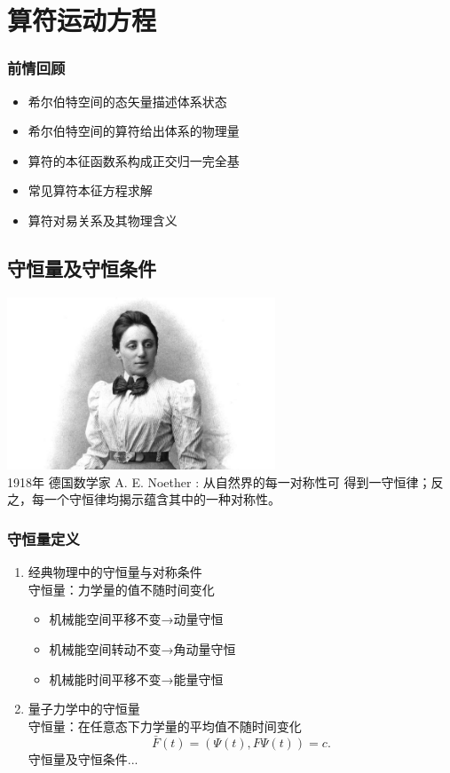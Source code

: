 

\section{算符运动方程}

\begin{frame}
    \frametitle{前情回顾}
    \begin{itemize}
        \item 希尔伯特空间的态矢量描述体系状态
        \item 希尔伯特空间的算符给出体系的物理量
        \item 算符的本征函数系构成正交归一完全基
        \item 常见算符本征方程求解
        \item 算符对易关系及其物理含义 
    \end{itemize}   
\end{frame} 

\subsection{守恒量及守恒条件}

\begin{frame}
\includegraphics[width=0.6\textwidth]{figs/2021-12-17-21-25-13.png} \\
1918年 德国数学家 A. E. Noether : 从自然界的每一对称性可
得到一守恒律；反之，每一个守恒律均揭示蕴含其中的一种对称性。
\end{frame} 

\begin{frame} 
    \frametitle{守恒量定义}
    \begin{enumerate}
        \item  经典物理中的守恒量与对称条件\\
                守恒量：力学量的值不随时间变化\\
                \begin{itemize}
                    \item 机械能空间平移不变→动量守恒
                    \item 机械能空间转动不变→角动量守恒
                    \item 机械能时间平移不变→能量守恒
                \end{itemize}
        \item  量子力学中的守恒量\\
                守恒量：在任意态下力学量的平均值不随时间变化\\
                $$ \bar{F}(t)=(\Psi(t), F\Psi(t)) =c.  $$
                守恒量及守恒条件... 
    \end{enumerate}
\end{frame} 

